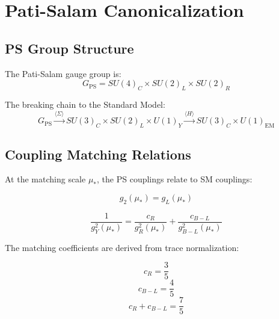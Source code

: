 \documentclass[11pt,a4paper]{article}
\begin{document}
\section{Pati-Salam Canonicalization}
\label{sec:ps-canon}

\subsection{PS Group Structure}
\label{subsec:ps-group}

The Pati-Salam gauge group is:
\begin{equation}
\label{eq:ps-group}
G_{\text{PS}} = SU(4)_C \times SU(2)_L \times SU(2)_R
\end{equation}

The breaking chain to the Standard Model:
\begin{equation}
\label{eq:ps-breaking}
G_{\text{PS}} \xrightarrow{\langle\Sigma\rangle} SU(3)_C \times SU(2)_L \times U(1)_Y \xrightarrow{\langle H\rangle} SU(3)_C \times U(1)_{\text{EM}}
\end{equation}

\subsection{Coupling Matching Relations}
\label{subsec:coupling-matching}

At the matching scale $\mu_*$, the PS couplings relate to SM couplings:

\begin{equation}
\label{eq:g2-match}
g_2(\mu_*) = g_L(\mu_*)
\end{equation}

\begin{equation}
\label{eq:gY-match}
\frac{1}{g_Y^2(\mu_*)} = \frac{c_R}{g_R^2(\mu_*)} + \frac{c_{B-L}}{g_{B-L}^2(\mu_*)}
\end{equation}

The matching coefficients are derived from trace normalization:

\begin{canonbox}
\label{box:ps-matching}
\begin{equation}
\label{eq:cR-value}
c_R = \frac{3}{5}
\end{equation}
\begin{equation}
\label{eq:cBL-value}
c_{B-L} = \frac{4}{5}
\end{equation}
\begin{equation}
\label{eq:cR-cBL-sum}
c_R + c_{B-L} = \frac{7}{5}
\end{equation}
\end{canonbox}
\end{document}

